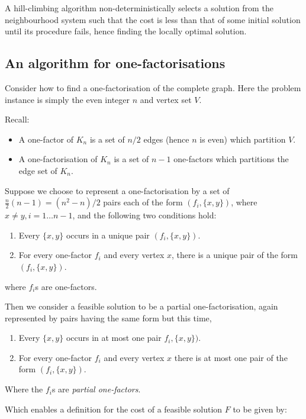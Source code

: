 A hill-climbing algorithm non-deterministically selects a
solution from the neighbourhood system such that the cost
is less than that of some initial solution until its
procedure fails, hence finding the locally optimal solution.

\subsection{An algorithm for one-factorisations}

Consider how to find a one-factorisation of the complete
graph. Here the problem instance is simply the even integer
$n$ and vertex set $V$.

Recall:
\begin{itemize}
  \item{A one-factor of $K_n$ is a set of $n/2$ edges (hence $n$ is even) which partition $V$.}
  \item{A one-factorisation of $K_n$ is a set of $n - 1$ one-factors which partitions the edge set of $K_n$.}
\end{itemize}

Suppose we choose to represent a one-factorisation by a set
of $\frac{n}{2}(n - 1) = (n^2 - n)/2$ pairs each of the form
$(f_i, \{x, y\})$, where $x \neq y, i = 1 \ldots n - 1$,
and the following two conditions hold:
\begin{enumerate}
  \item{Every $\{x, y\}$ occurs in a unique pair $(f_i, \{x, y\})$.}
  \item{For every one-factor $f_i$ and every vertex $x$, there is a unique pair of the form $(f_i, \{x, y\})$.}
\end{enumerate}
where $f_i$s are one-factors.

Then we consider a feasible solution to be a partial
one-factorisation, again represented by pairs having the
same form but this time,

\begin{enumerate}
  \item{Every $\{x, y\}$ occurs in at most one pair $f_i, \{x, y\})$.}
  \item{For every one-factor $f_i$ and every vertex $x$ there is at most one pair of the form $(f_i, \{x, y\})$.}
\end{enumerate}

Where the $f_i$s are
\emph{partial one-factors}.

Which enables a definition for the cost of a feasible solution $F$ to be given by:

